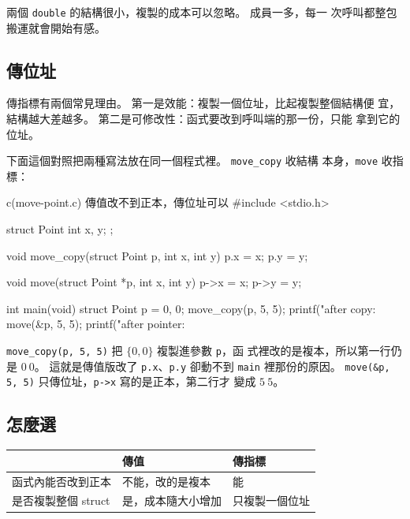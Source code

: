 兩個 \texttt{double} 的結構很小，複製的成本可以忽略。 成員一多，每一
次呼叫都整包搬運就會開始有感。

\subsection{傳位址}

傳指標有兩個常見理由。 第一是效能：複製一個位址，比起複製整個結構便
宜，結構越大差越多。 第二是可修改性：函式要改到呼叫端的那一份，只能
拿到它的位址。

下面這個對照把兩種寫法放在同一個程式裡。 \texttt{move\_copy} 收結構
本身，\texttt{move} 收指標：

\begin{example}{c}{(move-point.c) 傳值改不到正本，傳位址可以}
#include <stdio.h>

struct Point {
    int x, y;
};

void move_copy(struct Point p, int x, int y) {
    p.x = x;
    p.y = y;
}

void move(struct Point *p, int x, int y) {
    p->x = x;
    p->y = y;
}

int main(void) {
    struct Point p = {0, 0};
    move_copy(p, 5, 5);
    printf("after copy: %
    move(&p, 5, 5);
    printf("after pointer: %
}
\end{example}


\texttt{move\_copy(p, 5, 5)} 把 $\{0, 0\}$ 複製進參數 \texttt{p}，函
式裡改的是複本，所以第一行仍是 $0\ 0$。 這就是傳值版改了
\texttt{p.x}、\texttt{p.y} 卻動不到 \texttt{main} 裡那份的原因。
\texttt{move(\&p, 5, 5)} 只傳位址，\texttt{p->x} 寫的是正本，第二行才
變成 $5\ 5$。

\subsection{怎麼選}

\begin{center}
\begin{tabular}{|l|l|l|}
\hline
 & \textbf{傳值} & \textbf{傳指標} \\
\hline
函式內能否改到正本 & 不能，改的是複本 & 能 \\
是否複製整個 struct & 是，成本隨大小增加 & 只複製一個位址 \\
\hline
\end{tabular}
\end{center}

